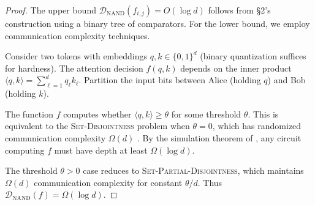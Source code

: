 \documentclass[11pt]{article}
\theoremstyle{definition}
\begin{document}
\begin{proof}






The upper bound $\mathcal{D}_{\text{NAND}}(f_{i,j}) = O(\log d)$ follows from §2's construction using a binary tree of comparators. For the lower bound, we employ communication complexity techniques.













Consider two tokens with embeddings $q, k \in \{0,1\}^d$ (binary quantization suffices for hardness). The attention decision $f(q,k)$ depends on the inner product $\langle q, k \rangle = \sum_{\ell=1}^d q_\ell k_\ell$. Partition the input bits between Alice (holding $q$) and Bob (holding $k$). 













The function $f$ computes whether $\langle q, k \rangle \geq \theta$ for some threshold $\theta$. This is equivalent to the \textsc{Set-Disjointness} problem when $\theta = 0$, which has randomized communication complexity $\Omega(d)$ \cite{kalyanasundaram1992probabilistic}. By the simulation theorem of \cite{karchmer1990monotone}, any circuit computing $f$ must have depth at least $\Omega(\log d)$.













The threshold $\theta > 0$ case reduces to \textsc{Set-Partial-Disjointness}, which maintains $\Omega(d)$ communication complexity for constant $\theta/d$. Thus $\mathcal{D}_{\text{NAND}}(f) = \Omega(\log d)$.






\end{proof}
\end{document}
